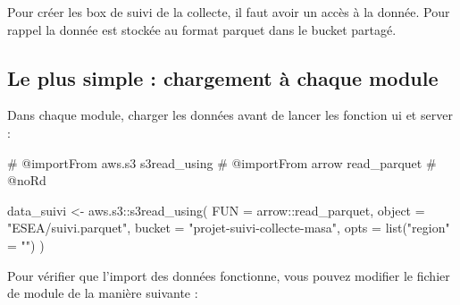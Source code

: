 \documentclass[
  letterpaper,
  DIV=11,
  numbers=noendperiod]{scrreprt}
\newenvironment{Shaded}{\begin{snugshade}}{\end{snugshade}}
\newcommand{\AttributeTok}[1]{\textcolor[rgb]{0.40,0.45,0.13}{#1}}
\newcommand{\CommentTok}[1]{\textcolor[rgb]{0.37,0.37,0.37}{#1}}
\newcommand{\ControlFlowTok}[1]{\textcolor[rgb]{0.00,0.23,0.31}{#1}}
\newcommand{\FunctionTok}[1]{\textcolor[rgb]{0.28,0.35,0.67}{#1}}
\newcommand{\NormalTok}[1]{\textcolor[rgb]{0.00,0.23,0.31}{#1}}
\newcommand{\OtherTok}[1]{\textcolor[rgb]{0.00,0.23,0.31}{#1}}
\newcommand{\SpecialCharTok}[1]{\textcolor[rgb]{0.37,0.37,0.37}{#1}}
\newcommand{\StringTok}[1]{\textcolor[rgb]{0.13,0.47,0.30}{#1}}
\begin{document}
Pour créer les box de suivi de la collecte, il faut avoir un accès à la
donnée. Pour rappel la donnée est stockée au format parquet dans le
bucket partagé.

\hypertarget{le-plus-simple-chargement-uxe0-chaque-module}{%
\subsection{Le plus simple : chargement à chaque
module}\label{le-plus-simple-chargement-uxe0-chaque-module}}

Dans chaque module, charger les données avant de lancer les fonction ui
et server :

\begin{Shaded}
\begin{Highlighting}[]
\CommentTok{\#\textquotesingle{} @importFrom aws.s3 s3read\_using}
\CommentTok{\#\textquotesingle{} @importFrom arrow read\_parquet}
\CommentTok{\#\textquotesingle{} @noRd}

\NormalTok{data\_suivi }\OtherTok{\textless{}{-}}\NormalTok{ aws.s3}\SpecialCharTok{::}\FunctionTok{s3read\_using}\NormalTok{(}
  \AttributeTok{FUN =}\NormalTok{ arrow}\SpecialCharTok{::}\NormalTok{read\_parquet,}
  \AttributeTok{object =} \StringTok{"ESEA/suivi.parquet"}\NormalTok{,}
  \AttributeTok{bucket =} \StringTok{"projet{-}suivi{-}collecte{-}masa"}\NormalTok{,}
  \AttributeTok{opts =} \FunctionTok{list}\NormalTok{(}\StringTok{"region"} \OtherTok{=} \StringTok{""}\NormalTok{)}
\NormalTok{)}
\end{Highlighting}
\end{Shaded}

Pour vérifier que l'import des données fonctionne, vous pouvez modifier
le fichier de module de la manière suivante :

\begin{Shaded}
\end{Shaded}
\end{document}
